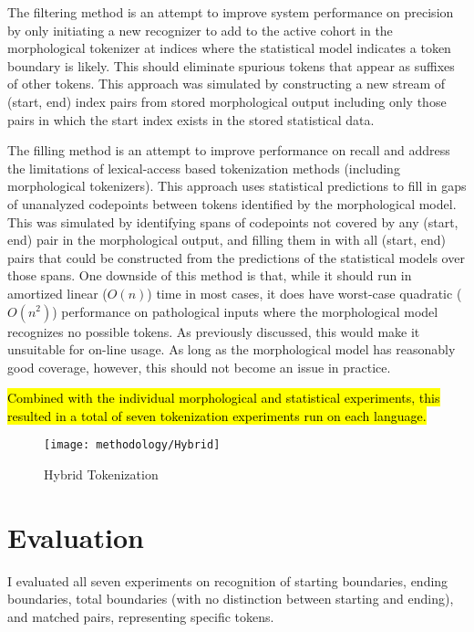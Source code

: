 The filtering method is an attempt to improve system performance on precision by only initiating a new recognizer to add to the active cohort in the morphological tokenizer at indices where the statistical model indicates a token boundary is likely. This should eliminate spurious tokens that appear as suffixes of other tokens. This approach was simulated by constructing a new stream of (start, end) index pairs from stored morphological output including only those pairs in which the start index exists in the stored statistical data.

The filling method is an attempt to improve performance on recall and address the limitations of lexical-access based tokenization methods (including morphological tokenizers). This approach uses statistical predictions to fill in gaps of unanalyzed codepoints between tokens identified by the morphological model. This was simulated by identifying spans of codepoints not covered by any (start, end) pair in the morphological output, and filling them in with all (start, end) pairs that could be constructed from the predictions of the statistical models over those spans. One downside of this method is that, while it should run in amortized linear ($O(n)$) time in most cases, it does have worst-case quadratic ($O(n^2)$) performance on pathological inputs where the morphological model recognizes no possible tokens. As previously discussed, this would make it unsuitable for on-line usage. As long as the morphological model has reasonably good coverage, however, this should not become an issue in practice.

\hl{Combined with the individual morphological and statistical experiments, this resulted in a total of seven tokenization experiments run on each language.}

\begin{figure}
	\texttt{[image: methodology/Hybrid]}
	\caption{Hybrid Tokenization}
	\label{hybriddiagram}
\end{figure}

\section{Evaluation}
I evaluated all seven experiments on recognition of starting boundaries, ending boundaries, total boundaries (with no distinction between starting and ending), and matched pairs, representing specific tokens.

